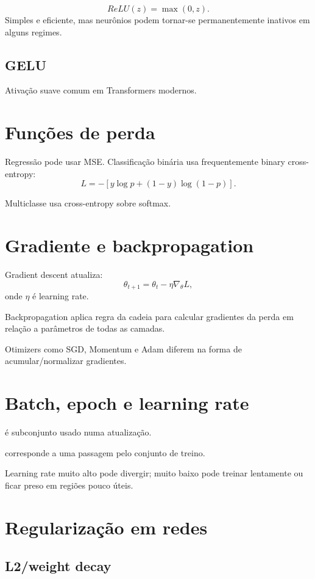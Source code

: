 \[
ReLU(z)=\max(0,z).
\]
Simples e eficiente, mas neurônios podem tornar-se permanentemente inativos em alguns regimes.

\subsection{GELU}

Ativação suave comum em Transformers modernos.

\section{Funções de perda}

Regressão pode usar MSE. Classificação binária usa frequentemente binary cross-entropy:
\[
L=-[y\log p+(1-y)\log(1-p)].
\]

Multiclasse usa cross-entropy sobre softmax.

\section{Gradiente e backpropagation}

Gradient descent atualiza:
\[
\theta_{t+1}=\theta_t-\eta\nabla_{\theta}L,
\]
onde $\eta$ é learning rate.

Backpropagation aplica regra da cadeia para calcular gradientes da perda em relação a parâmetros de todas as camadas.

Otimizers como SGD, Momentum e Adam diferem na forma de acumular/normalizar gradientes.

\section{Batch, epoch e learning rate}

 é subconjunto usado numa atualização.

 corresponde a uma passagem pelo conjunto de treino.

Learning rate muito alto pode divergir; muito baixo pode treinar lentamente ou ficar preso em regiões pouco úteis.

\section{Regularização em redes}

\subsection{L2/weight decay}

